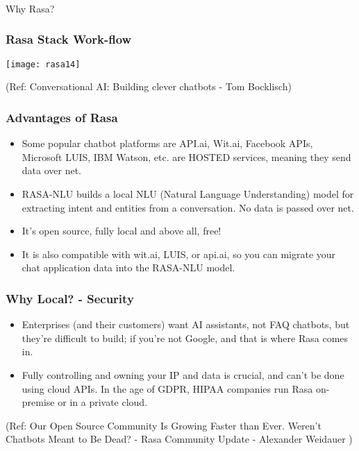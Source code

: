 \begin{frame}[fragile]\frametitle{}
\begin{center}
{\Large Why Rasa?}
\end{center}
\end{frame}

\begin{frame}[fragile]\frametitle{Rasa Stack Work-flow}


\begin{center}
\texttt{[image: rasa14]}
\end{center}


{\tiny (Ref: Conversational AI: Building clever chatbots - Tom Bocklisch)}

\end{frame}


 \begin{frame}[fragile]\frametitle{Advantages of Rasa}
\begin{itemize}
\item Some popular chatbot platforms are API.ai, Wit.ai, Facebook APIs, Microsoft LUIS, IBM Watson, etc. are HOSTED services, meaning they send data over net.
\item RASA-NLU builds a local NLU (Natural Language Understanding) model for extracting intent and entities from a conversation. No data is passed over net.
\item It's open source, fully local and above all, free! 
\item It is also compatible with wit.ai, LUIS, or api.ai, so you can migrate your chat application data into the RASA-NLU model.
\end{itemize}
\end{frame}

 \begin{frame}[fragile]\frametitle{Why Local? - Security}
\begin{itemize}
\item Enterprises (and their customers) want AI assistants, not FAQ chatbots, but they're difficult to build; if you're not Google, and that is where Rasa comes in.
\item Fully controlling and owning your IP and data is crucial, and can't be done using cloud APIs. In the age of GDPR, HIPAA companies run Rasa on-premise or in a private cloud.
\end{itemize}

{\tiny (Ref: Our Open Source Community Is Growing Faster than Ever. Weren't Chatbots Meant to Be Dead? - Rasa Community Update - Alexander Weidauer )}
\end{frame}

